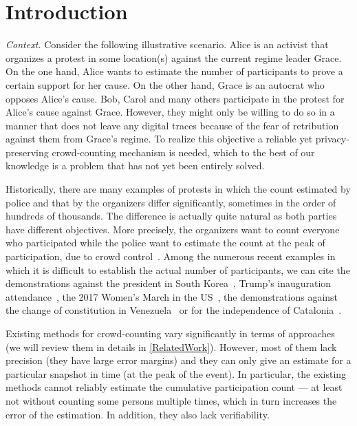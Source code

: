 \section{Introduction}%
\label{Introduction}

\emph{Context.} Consider the following illustrative scenario.
Alice is an activist that organizes a protest in some location(s) against the 
current regime leader Grace.
On the one hand, Alice wants to estimate the number of participants to prove a certain support for her cause.
On the other hand, Grace is an autocrat who opposes Alice's cause.
Bob, Carol and many others participate in the protest for Alice's cause against Grace.
However, they might only be willing to do so in a manner that does not leave any digital traces because of the fear of retribution against them from Grace's regime. 
To realize this objective a reliable yet privacy-preserving crowd-counting mechanism is needed, which to the best of our knowledge is a problem that has not yet been entirely solved.

Historically, there are many examples of protests in which the count estimated by police and that by the organizers 
differ significantly, sometimes in the order of hundreds of thousands.
The difference is actually quite natural as both parties have different objectives.
More precisely, the organizers want to count everyone who participated while the police want to estimate the count at the peak of participation, due to crowd control~\cite{2016DemonstrationsInSeoul}.
Among the numerous recent examples in which it is difficult to establish the actual number of participants, we can cite the demonstrations against the president in South Korea~\cite{2016DemonstrationsInSeoul}, Trump's inauguration attendance~\cite{HowWillWeKnowTrumpInauguralCrowdSize}, the 2017 Women's March in the US~\cite{2017WomensMarchesInUS}, the demonstrations against the change of constitution in Venezuela~\cite{AlJazeeraOnVenezuela2017} or for the independence of Catalonia~\cite{CataloniaDemonstrations}.

Existing methods for crowd-counting vary significantly in terms of approaches (we will review them in details in \cref{RelatedWork}).
However, most of them lack precision (\ie they have large error margins) and they can only give an estimate for a particular snapshot in time (\eg at the peak of the event). 
In particular, the existing methods cannot reliably estimate the cumulative participation count --- at least not without counting some persons multiple times, which in turn increases the error of the estimation.
In addition, they also lack verifiability. 

